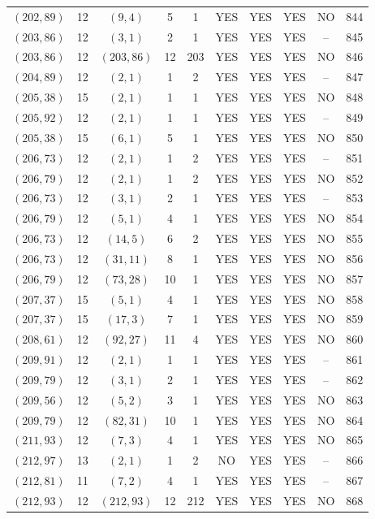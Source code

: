 \begin{longtable}{|c|c|c|c|c|c|c|c|c|c|}
$(202, 89)$ & 12 & $(9, 4)$ & 5 & 1 & YES & YES & YES & NO & 844\\
$(203, 86)$ & 12 & $(3, 1)$ & 2 & 1 & YES & YES & YES & -- & 845\\
$(203, 86)$ & 12 & $(203, 86)$ & 12 & 203 & YES & YES & YES & NO & 846\\
$(204, 89)$ & 12 & $(2, 1)$ & 1 & 2 & YES & YES & YES & -- & 847\\
$(205, 38)$ & 15 & $(2, 1)$ & 1 & 1 & YES & YES & YES & NO & 848\\
$(205, 92)$ & 12 & $(2, 1)$ & 1 & 1 & YES & YES & YES & -- & 849\\
$(205, 38)$ & 15 & $(6, 1)$ & 5 & 1 & YES & YES & YES & NO & 850\\
$(206, 73)$ & 12 & $(2, 1)$ & 1 & 2 & YES & YES & YES & -- & 851\\
$(206, 79)$ & 12 & $(2, 1)$ & 1 & 2 & YES & YES & YES & NO & 852\\
$(206, 73)$ & 12 & $(3, 1)$ & 2 & 1 & YES & YES & YES & -- & 853\\
$(206, 79)$ & 12 & $(5, 1)$ & 4 & 1 & YES & YES & YES & NO & 854\\
$(206, 73)$ & 12 & $(14, 5)$ & 6 & 2 & YES & YES & YES & NO & 855\\
$(206, 73)$ & 12 & $(31, 11)$ & 8 & 1 & YES & YES & YES & NO & 856\\
$(206, 79)$ & 12 & $(73, 28)$ & 10 & 1 & YES & YES & YES & NO & 857\\
$(207, 37)$ & 15 & $(5, 1)$ & 4 & 1 & YES & YES & YES & NO & 858\\
$(207, 37)$ & 15 & $(17, 3)$ & 7 & 1 & YES & YES & YES & NO & 859\\
$(208, 61)$ & 12 & $(92, 27)$ & 11 & 4 & YES & YES & YES & NO & 860\\
$(209, 91)$ & 12 & $(2, 1)$ & 1 & 1 & YES & YES & YES & -- & 861\\
$(209, 79)$ & 12 & $(3, 1)$ & 2 & 1 & YES & YES & YES & -- & 862\\
$(209, 56)$ & 12 & $(5, 2)$ & 3 & 1 & YES & YES & YES & NO & 863\\
$(209, 79)$ & 12 & $(82, 31)$ & 10 & 1 & YES & YES & YES & NO & 864\\
$(211, 93)$ & 12 & $(7, 3)$ & 4 & 1 & YES & YES & YES & NO & 865\\
$(212, 97)$ & 13 & $(2, 1)$ & 1 & 2 & NO & YES & YES & -- & 866\\
$(212, 81)$ & 11 & $(7, 2)$ & 4 & 1 & YES & YES & YES & -- & 867\\
$(212, 93)$ & 12 & $(212, 93)$ & 12 & 212 & YES & YES & YES & NO & 868\\

\end{longtable}
